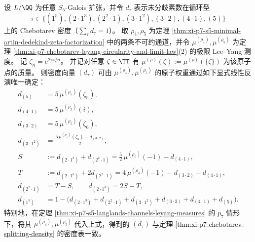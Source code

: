 \begin{theorem}\label{thm:xi-p7-leyang-inversion-recovers-chebotarev-densities}
设 \(L/\QQ\) 为任意 \(S_5\)-Galois 扩张，并令 \(d_\tau\) 表示未分歧素数在循环型
\[
\tau\in\{(1^5),(2\cdot 1^3),(2^2\cdot 1),(3\cdot 1^2),(3\cdot 2),(4\cdot 1),(5)\}
\]
上的 Chebotarev 密度（\(\sum_\tau d_\tau=1\)）。
取 \(\rho_4,\rho_5\) 为定理 \ref{thm:xi-p7-s5-minimal-artin-dedekind-zeta-factorization} 中的两条不可约通道，并令 \(\mu^{(\rho_4)},\mu^{(\rho_5)}\) 为定理 \ref{thm:xi-p7-chebotarev-leyang-circularity-and-limit-law}(2) 的极限 Lee--Yang 测度。
记 \(\zeta_n=e^{2\pi i/n}\)。
并记对任意 \(\zeta\in\TT\) 有 \(\mu^{(\rho)}(\zeta):=\mu^{(\rho)}(\{\zeta\})\) 为该原子点的质量。
则密度向量 \((d_\tau)\) 可由 \(\mu^{(\rho_4)},\mu^{(\rho_5)}\) 的原子权重通过如下显式线性反演唯一确定：
\[
\boxed{\begin{aligned}
d_{(5)}&=5\,\mu^{(\rho_5)}(\zeta_5),\\
d_{(4\cdot 1)}&=5\,\mu^{(\rho_5)}(i),\\
d_{(3\cdot 2)}&=5\,\mu^{(\rho_5)}(\zeta_6),\\
d_{(3\cdot 1^2)}&=\frac{5\,\mu^{(\rho_5)}(\zeta_3)-d_{(3\cdot 2)}}{2},\\
S&:=d_{(2\cdot 1^3)}+d_{(2^2\cdot 1)}=\frac{5}{2}\,\mu^{(\rho_5)}(-1)-d_{(4\cdot 1)},\\
T&:=d_{(2\cdot 1^3)}+2d_{(2^2\cdot 1)}=4\,\mu^{(\rho_4)}(-1)-d_{(3\cdot 2)}-d_{(4\cdot 1)},\\
d_{(2^2\cdot 1)}&=T-S,\qquad d_{(2\cdot 1^3)}=2S-T,\\
d_{(1^5)}&=1-\bigl(d_{(2\cdot 1^3)}+d_{(2^2\cdot 1)}+d_{(3\cdot 1^2)}+d_{(3\cdot 2)}+d_{(4\cdot 1)}+d_{(5)}\bigr).
\end{aligned}}
\]
特别地，在定理 \ref{thm:xi-p7-s5-langlands-channels-leyang-measures} 的 \(p_7\) 情形下，将其 \(\mu^{(\rho_4)},\mu^{(\rho_5)}\) 代入上式，得到的 \((d_\tau)\) 与定理 \ref{thm:xi-p7-chebotarev-splitting-density} 的密度表一致。
\end{theorem}

